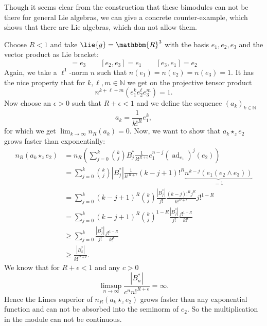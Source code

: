 Though it seems clear from the construction that these bimodules can not be 
there for general Lie algebras, we can give a concrete counter-example, which 
shows that there are Lie algebras, which don not allow them.
\begin{example}
	\label{Nilpot:Ex:NoModulesInGeneral}
	Choose $R < 1$ and take $\lie{g} = \mathbbm{R}^3$ with the basis $e_1, e_2, 
	e_3$ and the vector product as Lie bracket:
	\begin{equation*}
		[e_1, e_2] 
		= 
		e_3 
		\qquad 
		[e_2, e_3] 
		= 
		e_1 
		\qquad 
		[e_3, e_1] 
		= 
		e_2
	\end{equation*}
	Again, we take a $\ell^1$-norm $n$ such that $n(e_1) = n(e_2) = n(e_3) 
	= 1$. It has the nice property that for $k, \ell, m \in \mathbb{N}$ we get
	on the projective tensor product
	\begin{equation*}
		n^{k + \ell + m} \left(
			e_1^k e_2^{\ell} e_3^m
		\right)
		=
		1.
	\end{equation*}
	Now choose an $\epsilon > 0$ such that $R + \epsilon < 1$ and we define the 
	sequence $(a_k)_{k \in \mathbb{N}}$
	\begin{equation*}
		a_k 
		= 
		\frac{1}{k!^R} e_1^k,
	\end{equation*}
	for which we get $\lim_{k \longrightarrow \infty} n_R(a_k) = 0$. Now, we want 
	to show that $a_k \star_z e_2$ grows faster than exponentially:
	\begin{align*}
		n_R \left( a_k \star_z e_2 \right) 
		& = 
		n_R \left( 
			\sum\limits_{j = 0}^k 
			\binom{k}{j} B_j^* 
			\frac{1}{k!^{R + \epsilon}} 
			e_1^{n-j} 
			\left( 
				\operatorname{ad}_{e_1} 
			\right)^j(e_2) 
		\right)
		\\
		& =
		\sum\limits_{j = 0}^k 
		\binom{k}{j} 
		|B_j^*| 
		\frac{1}{k!^{R + \epsilon}} 
		(k-j+1)!^R 
		\underbrace{
			n^{k-j} \left( e_1 (e_2 \wedge e_3) \right)
		}_{ = 1}
		\\
		& = 
		\sum\limits_{j = 0}^k 
		(k-j+1)^R 
		\binom{k}{j}
		\frac{|B_j^*|}{j!} 
		\frac{(k-j)!^R j^R}{k!^{R + \epsilon}} 
		j!^{1-R}
		\\
		& = 
		\sum\limits_{j=0}^k 
		(k-j+1)^R 
		\binom{k}{j}^{1-R} 
		\frac{|B_j^*|}{j!} 
		\frac{j!^{1-R}}{k!^\epsilon}
		\\
		& \geq 
		\sum\limits_{j=0}^k 
		\frac{|B_j^*|}{j!} 
		\frac{j!^{1-R}}{k!^\epsilon}
		\\
		& \geq 
		\frac{|B_k^*|}{k!^{R + \epsilon}}.
	\end{align*}
	We know that for $R +\epsilon < 1$ and any $c > 0$
	\begin{equation*}
		\limsup_{n \longrightarrow \infty}
		\frac{|B_n^*|}{c^n n!^{R + \epsilon}}
		=
		\infty.
	\end{equation*}
	Hence the Limes superior of $n_R \left( a_k \star_z e_2 \right) $ grows 
	faster than any exponential function and can not be absorbed into the seminorm 
	of $e_2$. So the multiplication in the module can not be continuous.
\end{example}



